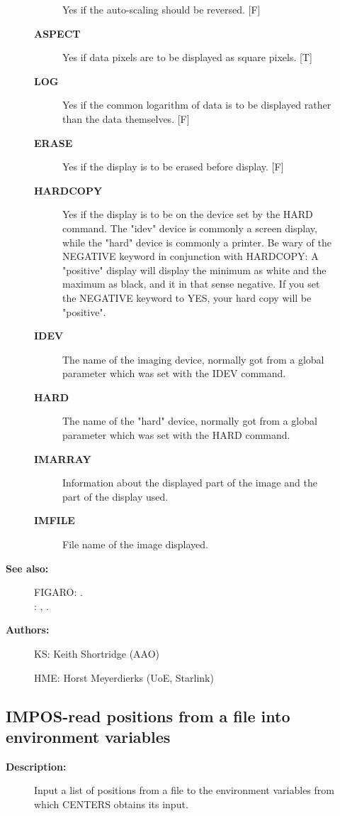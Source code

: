 \begin{description}
\begin{description}
\begin{description}
 Yes if the auto-scaling should be reversed. [F]
\item [\textbf{ASPECT}]
 Yes if data pixels are to be displayed as square pixels. [T]
\item [\textbf{LOG}]
 Yes if the common logarithm of data is to be displayed rather
 than the data themselves. [F]
\item [\textbf{ERASE}]
 Yes if the display is to be erased before display. [F]
\item [\textbf{HARDCOPY}]
 Yes if the display is to be on the device set by the HARD
 command. The "idev" device is commonly a screen display, while
 the "hard" device is commonly a printer.   Be wary of the
 NEGATIVE keyword in conjunction with HARDCOPY:  A "positive"
 display will display the minimum as white and the maximum as
 black, and it in that sense negative. If you set the NEGATIVE
 keyword to YES, your hard copy will be "positive".
\item [\textbf{IDEV}]
 The name of the imaging device, normally got from a global
 parameter which was set with the IDEV command.
\item [\textbf{HARD}]
 The name of the "hard" device, normally got from a global
 parameter which was set with the HARD command.
\item [\textbf{IMARRAY}]
 Information about the displayed part of the image and the part
 of the display used.
\item [\textbf{IMFILE}]
 File name of the image displayed.
\end{description}

\item [\textbf{See also:}]
FIGARO: .\\
: , .\\

\item [\textbf{Authors:}]
 KS: Keith Shortridge (AAO)

 HME: Horst Meyerdierks (UoE, Starlink)
\end{description}
\subsection{IMPOS-\label{IMPOS}read positions from a file into environment variables}
\begin{description}

\item [\textbf{Description:}]
 Input a list of positions from a file to the environment variables
 from which CENTERS obtains its input.


\end{description}
\end{description}
